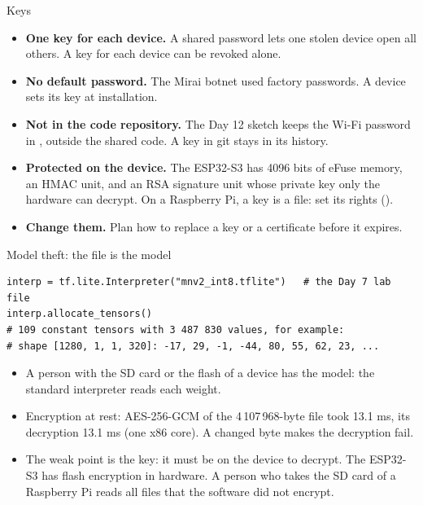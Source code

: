 \begin{frame}{Keys}
  \small
  \begin{itemize}
    \item \textbf{One key for each device.} A shared password lets one
          stolen device open all others. A key for each device can be
          revoked alone.
    \item \textbf{No default password.} The Mirai botnet used factory
          passwords. A device sets its key at installation.
    \item \textbf{Not in the code repository.} The Day 12 sketch keeps the
          Wi-Fi password in , outside the shared
          code. A key in git stays in its history.
    \item \textbf{Protected on the device.} The ESP32-S3 has 4096 bits of
          eFuse memory, an HMAC unit, and an RSA signature unit whose private
          key only the hardware can decrypt. On a Raspberry Pi, a key is a
          file: set its rights ().
    \item \textbf{Change them.} Plan how to replace a key or a certificate
          before it expires.
  \end{itemize}
\end{frame}

\begin{frame}[fragile]{Model theft: the file is the model}
\begin{lstlisting}[style=python, basicstyle=\ttfamily\scriptsize]
interp = tf.lite.Interpreter("mnv2_int8.tflite")   # the Day 7 lab file
interp.allocate_tensors()
# 109 constant tensors with 3 487 830 values, for example:
# shape [1280, 1, 1, 320]: -17, 29, -1, -44, 80, 55, 62, 23, ...
\end{lstlisting}
  \small
  \begin{itemize}
    \item A person with the SD card or the flash of a device has the model:
          the standard interpreter reads each weight.
    \item Encryption at rest: AES-256-GCM of the 4\,107\,968-byte file took
          13.1 ms, its decryption 13.1 ms (one x86 core). A changed byte makes
          the decryption fail.
    \item The weak point is the key: it must be on the device to decrypt.
          The ESP32-S3 has flash encryption in hardware. A person who takes
          the SD card of a Raspberry Pi reads all files that the software
          did not encrypt.
  \end{itemize}
\end{frame}

